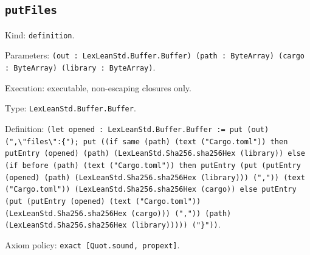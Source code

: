 \documentclass[11pt]{article}
\begin{document}
\subsection*{\texttt{putFiles}}
\noindent Kind: \texttt{definition}.\par
\noindent Parameters: \texttt{(out : LexLeanStd.Buffer.Buffer) (path : ByteArray) (cargo : ByteArray) (library : ByteArray)}.\par
\noindent Execution: executable, non-escaping closures only.\par
\noindent Type: \texttt{LexLeanStd.Buffer.Buffer}.\par
\noindent Definition: \texttt{(let opened : LexLeanStd.Buffer.Buffer := put (out) (",\textbackslash{}"files\textbackslash{}":\{"); put ((if same (path) (text ("Cargo.toml")) then putEntry (opened) (path) (LexLeanStd.Sha256.sha256Hex (library)) else (if before (path) (text ("Cargo.toml")) then putEntry (put (putEntry (opened) (path) (LexLeanStd.Sha256.sha256Hex (library))) (",")) (text ("Cargo.toml")) (LexLeanStd.Sha256.sha256Hex (cargo)) else putEntry (put (putEntry (opened) (text ("Cargo.toml")) (LexLeanStd.Sha256.sha256Hex (cargo))) (",")) (path) (LexLeanStd.Sha256.sha256Hex (library))))) ("\}"))}.\par
\noindent Axiom policy: \texttt{exact [Quot.sound, propext]}.\par
\end{document}
